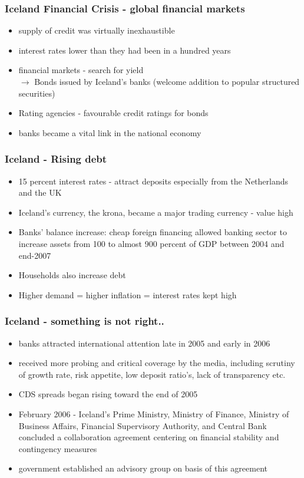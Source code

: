 \documentclass[11pt]{beamer}
\begin{document}
\begin{frame}
\frametitle{Iceland Financial Crisis - global financial markets}
\begin{itemize}
\item supply of credit was virtually inexhaustible
\item interest rates lower than they had been in a hundred years
\item financial markets - search for yield \\
$\rightarrow$ Bonds issued by Iceland's banks (welcome addition to popular structured securities)
\item Rating agencies - favourable credit ratings for bonds
\item banks became a vital link in the national economy
\end{itemize}
\end{frame}

\begin{frame}
\frametitle{Iceland - Rising debt}
\begin{itemize}
\item 15 percent interest rates - attract deposits especially from the Netherlands and the UK
\item Iceland's currency, the krona, became a major trading currency - value high
\item Banks' balance increase: cheap foreign financing allowed banking sector to increase assets from 100 to almost 900 percent of GDP between 2004 and end-2007
\item Households also increase debt
\item Higher demand = higher inflation = interest rates kept high
\end{itemize}
\end{frame}

\begin{frame}
\frametitle{Iceland - something is not right..}
\begin{itemize}
\item banks attracted international attention late in 2005 and early in 2006
\item  received more probing and critical coverage by the media, including scrutiny of growth rate, risk appetite, low deposit ratio's, lack of transparency etc.
\item  CDS spreads began rising toward the end of 2005
\item   February 2006 - Iceland’s Prime Ministry, Ministry of Finance, Ministry of Business Affairs, Financial Supervisory Authority, and Central Bank concluded a collaboration agreement centering on financial stability and contingency measures
\item government established an advisory group on basis of this agreement
\end{itemize}
\end{frame}
\end{document}
